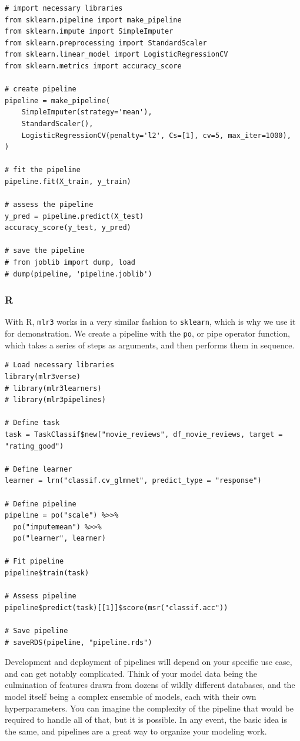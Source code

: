 \documentclass[
  letterpaper,
]{krantz}
\begin{document}
\begin{verbatim}
# import necessary libraries
from sklearn.pipeline import make_pipeline
from sklearn.impute import SimpleImputer
from sklearn.preprocessing import StandardScaler
from sklearn.linear_model import LogisticRegressionCV
from sklearn.metrics import accuracy_score

# create pipeline
pipeline = make_pipeline(
    SimpleImputer(strategy='mean'),
    StandardScaler(),
    LogisticRegressionCV(penalty='l2', Cs=[1], cv=5, max_iter=1000),
)

# fit the pipeline
pipeline.fit(X_train, y_train)

# assess the pipeline
y_pred = pipeline.predict(X_test)
accuracy_score(y_test, y_pred)

# save the pipeline
# from joblib import dump, load
# dump(pipeline, 'pipeline.joblib')
\end{verbatim}

\subsubsection{R}

With R, \texttt{mlr3} works in a very similar fashion to
\texttt{sklearn}, which is why we use it for demonstration. We create a
pipeline with the \texttt{po}, or pipe operator function, which takes a
series of steps as arguments, and then performs them in sequence.

\begin{verbatim}
# Load necessary libraries
library(mlr3verse)
# library(mlr3learners)
# library(mlr3pipelines)

# Define task
task = TaskClassif$new("movie_reviews", df_movie_reviews, target = "rating_good")

# Define learner
learner = lrn("classif.cv_glmnet", predict_type = "response")

# Define pipeline
pipeline = po("scale") %>>%
  po("imputemean") %>>%
  po("learner", learner)

# Fit pipeline
pipeline$train(task)

# Assess pipeline
pipeline$predict(task)[[1]]$score(msr("classif.acc"))

# Save pipeline
# saveRDS(pipeline, "pipeline.rds")
\end{verbatim}

Development and deployment of pipelines will depend on your specific use
case, and can get notably complicated. Think of your model data being
the culmination of features drawn from dozens of wildly different
databases, and the model itself being a complex ensemble of models, each
with their own hyperparameters. You can imagine the complexity of the
pipeline that would be required to handle all of that, but it is
possible. In any event, the basic idea is the same, and pipelines are a
great way to organize your modeling work.
\end{document}
